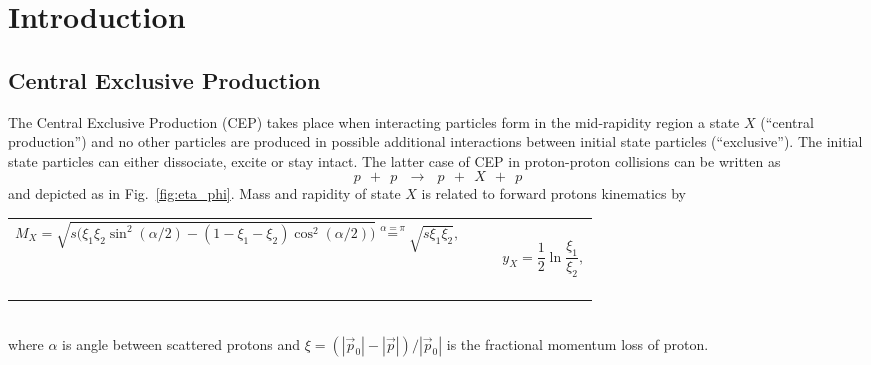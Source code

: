 

\chapter{Introduction}\label{chap:introduction}

\section{Central Exclusive Production}
The Central Exclusive Production (CEP) takes place when interacting particles form in the mid-rapidity region a state $X$ (``central production'') and no other particles are produced in possible additional interactions between initial state particles (``exclusive''). The initial state particles can either dissociate, excite or stay intact. The latter case of CEP in proton-proton collisions can be written as
\begin{equation}\label{eq:cep}%
p~~+~~p~~~\rightarrow~~~p~~+~~X~~+~~p
\end{equation}
and depicted as in Fig.~\ref{fig:eta_phi}. Mass and rapidity of state $X$ is related to forward protons kinematics by\\[-10pt]
\begin{tabulary}{\textwidth}{CCR}
\begin{equation}\label{eq:mass_X}
M_{X} = \sqrt{s\Big(\xi_{1}\xi_{2}\sin^{2}{(\alpha/2)}-(1-\xi_{1}-\xi_{2})\cos^{2}{(\alpha/2)}\Big)} \stackrel{\alpha=\pi}{=} \sqrt{s\xi_{1}\xi_{2}},
\end{equation}~~~~~~~~~~~~~~~~ & ~~ & ~~~~~~
\begin{equation}\label{eq:rapidity_X}
y_{X} = \frac{1}{2}\ln{\frac{\xi_{1}}{\xi_{2}}},
\end{equation}~~~~~~~~
\end{tabulary}\\[-10pt]
where $\alpha$ is angle between scattered protons and $\xi=\left(|\vec{p}_{0}|-|\vec{p}|\right)/|\vec{p}_{0}|$ is the fractional momentum loss of proton.\vspace{-5pt}

